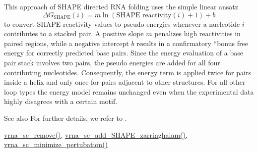 This approach of S\+H\+A\+PE directed R\+NA folding uses the simple linear ansatz \[ \Delta G_{\text{SHAPE}}(i) = m \ln(\text{SHAPE reactivity}(i)+1)+ b \] to convert S\+H\+A\+PE reactivity values to pseudo energies whenever a nucleotide $ i $ contributes to a stacked pair. A positive slope $ m $ penalizes high reactivities in paired regions, while a negative intercept $ b $ results in a confirmatory ``bonus\textquotesingle{}\textquotesingle{} free energy for correctly predicted base pairs. Since the energy evaluation of a base pair stack involves two pairs, the pseudo energies are added for all four contributing nucleotides. Consequently, the energy term is applied twice for pairs inside a helix and only once for pairs adjacent to other structures. For all other loop types the energy model remains unchanged even when the experimental data highly disagrees with a certain motif.

\begin{DoxySeeAlso}{See also}
For further details, we refer to \cite{deigan:2009}. 

\hyperlink{group__soft__constraints_ga73cdc07b9a199c614367bebef0f2c41a}{vrna\+\_\+sc\+\_\+remove()}, \hyperlink{group__SHAPE__reactivities_gaf3c65a045060aef5c4e41693d30af58c}{vrna\+\_\+sc\+\_\+add\+\_\+\+S\+H\+A\+P\+E\+\_\+zarringhalam()}, \hyperlink{group__perturbation_gaa124bdc20d88001c38ade590c4bcc3c4}{vrna\+\_\+sc\+\_\+minimize\+\_\+pertubation()}
\end{DoxySeeAlso}

